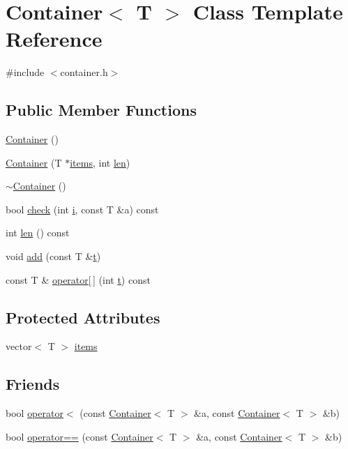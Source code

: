 \hypertarget{class_container}{\section{Container$<$ T $>$ Class Template Reference}
\label{class_container}
}


{\ttfamily \#include $<$container.\+h$>$}

\subsection*{Public Member Functions}
\begin{DoxyCompactItemize}
\item 
\hyperlink{class_container_ab17ce1f67243b28abcd4c8113a72524c}{Container} ()
\item 
\hyperlink{class_container_a3588c5096f50a0a6020403bc5a5ca68b}{Container} (T $\ast$\hyperlink{class_container_adf060dcd6dfb12774aced955881149d8}{items}, int \hyperlink{class_container_a28ddede70f4d2c63b8571291b714d6ff}{len})
\item 
\hyperlink{class_container_a5b3440c3177017d2d6a190724e7078ec}{$\sim$\+Container} ()
\item 
bool \hyperlink{class_container_a2e97d3b9786e4b6ae9404a9f18ffe2fb}{check} (int \hyperlink{process__options_8m_a6f6ccfcf58b31cb6412107d9d5281426}{i}, const T \&a) const 
\item 
int \hyperlink{class_container_a28ddede70f4d2c63b8571291b714d6ff}{len} () const 
\item 
void \hyperlink{class_container_afb84989fc3eaa501fab06c148facd5e3}{add} (const T \&\hyperlink{readhtk_8m_aaccc9105df5383111407fd5b41255e23}{t})
\item 
const T \& \hyperlink{class_container_acbf6c7d4dbebe662467b35c7b0f48487}{operator\mbox{[}$\,$\mbox{]}} (int \hyperlink{readhtk_8m_aaccc9105df5383111407fd5b41255e23}{t}) const 
\end{DoxyCompactItemize}
\subsection*{Protected Attributes}
\begin{DoxyCompactItemize}
\item 
vector$<$ T $>$ \hyperlink{class_container_adf060dcd6dfb12774aced955881149d8}{items}
\end{DoxyCompactItemize}
\subsection*{Friends}
\begin{DoxyCompactItemize}
\item 
bool \hyperlink{class_container_a5f79f5574a200f0de7733d28852ddb99}{operator$<$} (const \hyperlink{class_container}{Container}$<$ T $>$ \&a, const \hyperlink{class_container}{Container}$<$ T $>$ \&b)
\item 
bool \hyperlink{class_container_a21fc06e1d8b2414882e2c0e65464c42b}{operator==} (const \hyperlink{class_container}{Container}$<$ T $>$ \&a, const \hyperlink{class_container}{Container}$<$ T $>$ \&b)
\end{DoxyCompactItemize}


